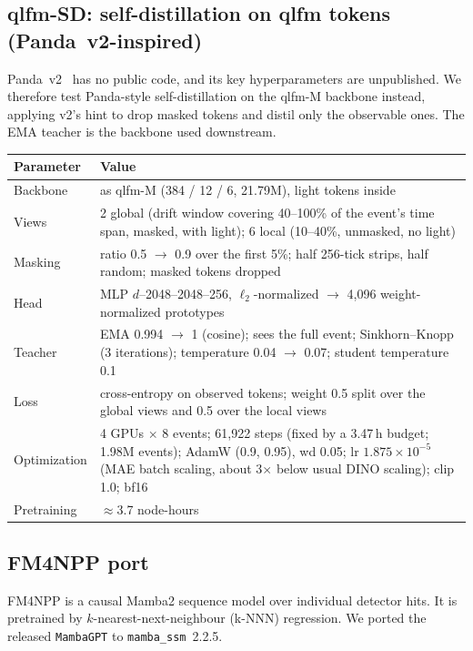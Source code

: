 \documentclass[11pt,a4paper]{article}
\newcommand{\code}[1]{\texttt{\small #1}}
\begin{document}
\subsection{qlfm-SD: self-distillation on qlfm tokens (Panda~v2-inspired)}
Panda~v2~\cite{pandav2} has no public code, and its key hyperparameters are unpublished. We therefore test Panda-style self-distillation on the qlfm-M backbone instead, applying v2's hint to drop masked tokens and distil only the observable ones. The EMA teacher is the backbone used downstream.
\begin{center}\small
\begin{tabularx}{\textwidth}{lL}
\toprule
Parameter & Value\\
\midrule
Backbone & as qlfm-M (384 / 12 / 6, 21.79M), light tokens inside\\
Views & 2 global (drift window covering 40--100\% of the event's time span, masked, with light); 6 local (10--40\%, unmasked, no light)\\
Masking & ratio 0.5 $\to$ 0.9 over the first 5\%; half 256-tick strips, half random; masked tokens dropped\\
Head & MLP $d$--2048--2048--256, $\ell_2$-normalized $\to$ 4{,}096 weight-normalized prototypes\\
Teacher & EMA 0.994 $\to$ 1 (cosine); sees the full event; Sinkhorn--Knopp (3 iterations); temperature 0.04 $\to$ 0.07; student temperature 0.1\\
Loss & cross-entropy on observed tokens; weight 0.5 split over the global views and 0.5 over the local views\\
Optimization & 4 GPUs $\times$ 8 events; 61{,}922 steps (fixed by a 3.47\,h budget; 1.98M events); AdamW (0.9, 0.95), wd 0.05; lr $1.875\times10^{-5}$ (MAE batch scaling, about 3$\times$ below usual DINO scaling); clip 1.0; bf16\\
Pretraining & $\approx$3.7 node-hours\\
\bottomrule
\end{tabularx}
\end{center}

\subsection{FM4NPP port~\cite{fm4npp}}
FM4NPP is a causal Mamba2 sequence model over individual detector hits. It is pretrained by $k$-nearest-next-neighbour (k-NNN) regression. We ported the released \code{MambaGPT} to \code{mamba\_ssm}~2.2.5.
\end{document}
